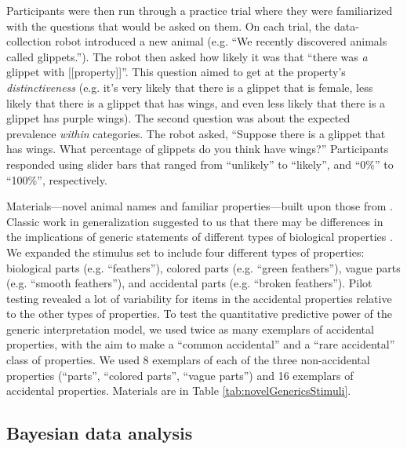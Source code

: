 \documentclass[10pt,letterpaper]{article}
\begin{document}
Participants were then run through a practice trial where they were familiarized with the questions that would be asked on them. 
On each trial, the data-collection robot introduced a new animal (e.g. ``We recently discovered animals called glippets.''). 
The robot then asked how likely it was that ``there was \emph{a} glippet with [[property]]''. 
This question aimed to get at the property's \emph{distinctiveness}
(e.g. it's very likely that there is a glippet that is female, less likely that there is a glippet that has wings, and even less likely that there is a glippet has purple wings). 
The second question was about the expected prevalence \emph{within} categories. 
The robot asked, ``Suppose there is a glippet that has wings. What percentage of glippets do you think have wings?'' Participants responded using slider bars that ranged from ``unlikely'' to ``likely'', and ``0\%'' to ``100\%'', respectively.


Materials---novel animal names and familiar properties---built upon those from . 
Classic work in generalization suggested to us that there may be differences in the implications of generic statements of different types of biological properties \cite{Nisbett1983}. 
We expanded the stimulus set to include four different types of properties: biological parts (e.g. ``feathers''), colored parts (e.g. ``green feathers''), vague parts (e.g. ``smooth feathers''), and accidental parts (e.g. ``broken feathers''). 
Pilot testing revealed a lot of variability for items in the accidental properties relative to the other types of properties. 
To test the quantitative predictive power of the generic interpretation model, we used twice as many exemplars of accidental properties, with the aim to make a ``common accidental'' and a ``rare accidental'' class of properties. 
We used 8 exemplars of each of the three non-accidental properties (``parts'', ``colored parts'', ``vague parts'') and 16 exemplars of accidental properties.
Materials are in Table \ref{tab:novelGenericsStimuli}.

\subsection{Bayesian data analysis}
\label{sec:bda2}
\end{document}

